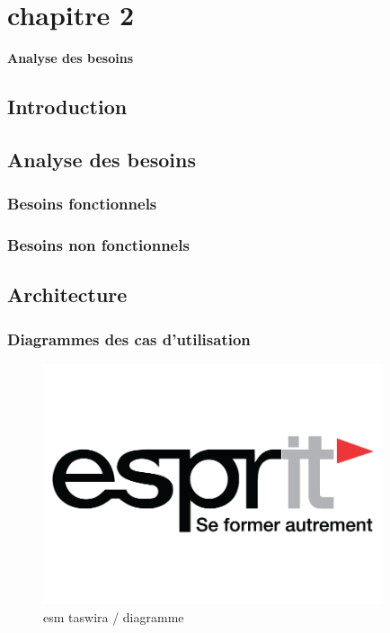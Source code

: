 
\chapter*{chapitre 2}

\textbf{\Huge Analyse des besoins}

\setcounter{chapter}{2}
\setcounter{section}{0}


\section{Introduction}

\section{Analyse des besoins}


\subsection{Besoins fonctionnels}


\subsection{Besoins non fonctionnels}


\section{Architecture}
\subsection{Diagrammes des cas d'utilisation}

\begin{flushleft}

	\begin{figure}[h!]
		\centering
		\includegraphics[width=10cm]{resources/images/logo.png}
		\caption{esm taswira / diagramme }
		\label{3}
	\end{figure}

\end{flushleft}


